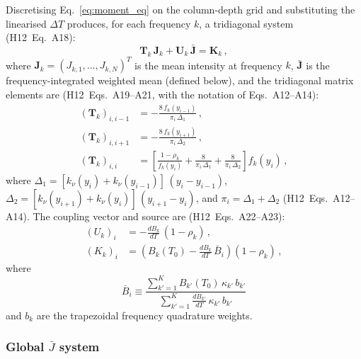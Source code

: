 Discretising Eq.~\eqref{eq:moment_eq} on the column-depth grid and substituting the linearised $\Delta T$ produces, for each frequency $k$, a tridiagonal system (H12~Eq.~A18):
\begin{equation}
  \mathbf{T}_k\,\mathbf{J}_k + \mathbf{U}_k\,\bar{\mathbf{J}} = \mathbf{K}_k\,,
  \label{eq:rybicki_tridiag}
\end{equation}
where $\mathbf{J}_k = (J_{k,1},\dots,J_{k,N})^T$ is the mean intensity at frequency $k$, $\bar{\mathbf{J}}$ is the frequency-integrated weighted mean (defined below), and the tridiagonal matrix elements are (H12~Eqs.~A19--A21, with the notation of Eqs.~A12--A14):
\begin{align}
  (\mathbf{T}_k)_{i,i-1} &= -\frac{8\,f_k(y_{i-1})}{\pi_i\,\Delta_1}\,,
  \label{eq:Tk_sub}\\[3pt]
  (\mathbf{T}_k)_{i,i+1} &= -\frac{8\,f_k(y_{i+1})}{\pi_i\,\Delta_2}\,,
  \label{eq:Tk_sup}\\[3pt]
  (\mathbf{T}_k)_{i,i} &= \left[\frac{1-\rho_k}{f_k(y_i)}
    + \frac{8}{\pi_i\,\Delta_1} + \frac{8}{\pi_i\,\Delta_2}\right]f_k(y_i)\,,
  \label{eq:Tk_diag}
\end{align}
where $\Delta_1 = [k_\nu(y_i)+k_\nu(y_{i-1})]\,(y_i-y_{i-1})$, \; $\Delta_2 = [k_\nu(y_{i+1})+k_\nu(y_i)]\,(y_{i+1}-y_i)$, and $\pi_i = \Delta_1+\Delta_2$ (H12~Eqs.~A12--A14). The coupling vector and source are (H12~Eqs.~A22--A23):
\begin{align}
  (U_k)_i &= -\frac{dB_k}{dT}\,(1-\rho_k)\,,
  \label{eq:Uk}\\[3pt]
  (K_k)_i &= \left(B_k(T_0) - \frac{dB_k}{dT}\,\bar{B}_i\right)(1-\rho_k)\,,
  \label{eq:Kk}
\end{align}
where
\begin{equation}
  \bar{B}_i \equiv
  \frac{\sum_{k'=1}^{K} B_{k'}(T_0)\,\kappa_{k'}\,b_{k'}}
       {\sum_{k'=1}^{K} \frac{dB_{k'}}{dT}\,\kappa_{k'}\,b_{k'}}
  \label{eq:Bbar}
\end{equation}
and $b_k$ are the trapezoidal frequency quadrature weights.

\subsubsection{Global $\bar{J}$ system}

